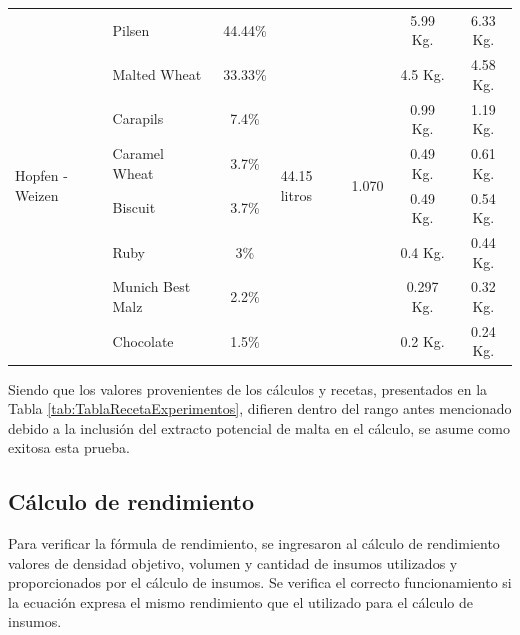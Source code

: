 \begin{longtable}{|p{1.8cm}|p{1.8cm}|p{1.8cm}|p{1.9cm}|p{1.7cm}|p{2cm}|p{2cm}|}
        \hline
        \multirow{8}{2cm}{Hopfen - Weizen} & Pilsen &\multicolumn{1}{c|}{44.44\%}  &\multirow{8}{2cm}{44.15 litros}  &\multirow{8}{2cm}{1.070} & \multicolumn{1}{c|}{5.99 Kg.} & \multicolumn{1}{c|}{6.33 Kg.}\\
         & Malted Wheat & \multicolumn{1}{c|}{33.33\%} & & &\multicolumn{1}{c|}{4.5 Kg.} &\multicolumn{1}{c|}{4.58 Kg.} \\
         & Carapils & \multicolumn{1}{c|}{7.4\%} & & &\multicolumn{1}{c|}{0.99 Kg.} &\multicolumn{1}{c|}{1.19 Kg.} \\
         & Caramel Wheat & \multicolumn{1}{c|}{3.7\%} & & &\multicolumn{1}{c|}{0.49 Kg.} &\multicolumn{1}{c|}{0.61 Kg.} \\
         & Biscuit & \multicolumn{1}{c|}{3.7\%} & & &\multicolumn{1}{c|}{0.49 Kg.} &\multicolumn{1}{c|}{0.54 Kg.} \\
         & Ruby & \multicolumn{1}{c|}{3\%} & & &\multicolumn{1}{c|}{0.4 Kg.} &\multicolumn{1}{c|}{0.44 Kg.} \\
         & Munich Best Malz & \multicolumn{1}{c|}{2.2\%} & & &\multicolumn{1}{c|}{0.297 Kg.} &\multicolumn{1}{c|}{0.32 Kg.} \\
         & Chocolate & \multicolumn{1}{c|}{1.5\%} & & &\multicolumn{1}{c|}{0.2 Kg.} &\multicolumn{1}{c|}{0.24 Kg.} \\
        \hline
    
\end{longtable}

\par Siendo que los valores provenientes de los cálculos y recetas, presentados en la Tabla \ref{tab:TablaRecetaExperimentos}, difieren dentro del rango antes mencionado debido a la inclusión del extracto potencial de malta en el cálculo, se asume como exitosa esta prueba. %

\subsection{Cálculo de rendimiento}
\par Para verificar la fórmula de rendimiento, se ingresaron al cálculo de rendimiento valores de densidad objetivo, volumen y cantidad de insumos utilizados y proporcionados por el cálculo de insumos. Se verifica el correcto funcionamiento si la ecuación expresa el mismo rendimiento que el utilizado para el cálculo de insumos.

